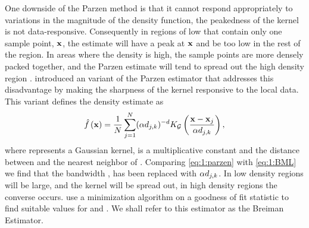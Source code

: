 One downside of the Parzen method is that it cannot respond appropriately to variations in the magnitude of the density function, \ie the peakedness of the kernel is not data-responsive. Consequently in regions of low \varDensityFunction{\varPattern} that contain only one sample point, $\varPattern$, the estimate will have a peak at $\varPattern$ and be too low in the rest of the region. In areas where the density is high, the sample points are more densely packed together, and the Parzen estimate will tend to spread out the high density region \cite{breiman1977variable}. \citeauthor{breiman1977variable} introduced an variant of the Parzen estimator that addresses this disadvantage by making the sharpness of the kernel responsive to the local data. This variant defines the density estimate as
\begin{equation}\label{eq:1:BML}
 	\varEstimatedDensityFunction{\varPattern} = \frac{1}{\varNumPatterns} \sum_{j = 1}^{\varNumPatterns} (\varBMLconstant \varKNNDistance{j}{k})^{-\varDim} \varKernel[\varGaussian]{\frac{\varPattern - \varPattern[j]}{\varBMLconstant \varKNNDistance{j}{k}}},
\end{equation} 
%
where \varKernel[\varGaussian]{\cdot} represents a Gaussian kernel, \varBMLconstant is a multiplicative constant and  the distance between \varPattern[j] and the \KNNK nearest neighbor of \varPattern[j]. Comparing \cref{eq:1:parzen} with \eqref{eq:1:BML} we find that the bandwidth \varBandwidth, has been replaced with $\alpha d_{j, k}$.  In low density regions  will be large, and the kernel will be spread out, in high density regions the converse occurs. \citeauthor{breiman1977variable} use a minimization algorithm on a goodness of fit statistic to find suitable values for \KNNK and \varBMLconstant. We shall refer to this estimator as the Breiman Estimator. 


